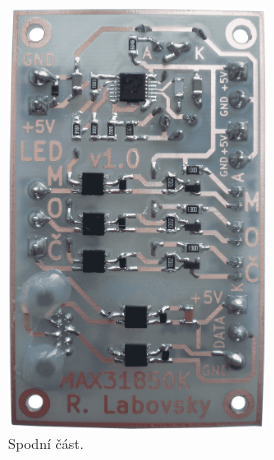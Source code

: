 \begin{figure}[H]
\centering
\begin{subfigure}{.5\textwidth}
    \centering
    \includegraphics[width=0.75\textwidth]{images/krb/dps-led-ochrany-u-krbu-spodek.png}
    \caption{Spodní část.}
    \label{fig:dps-led-ochrany-u-krbu-spodek}
\end{subfigure}%
\begin{subfigure}{.5\textwidth}
    \centering

\end{subfigure}
\end{figure}
